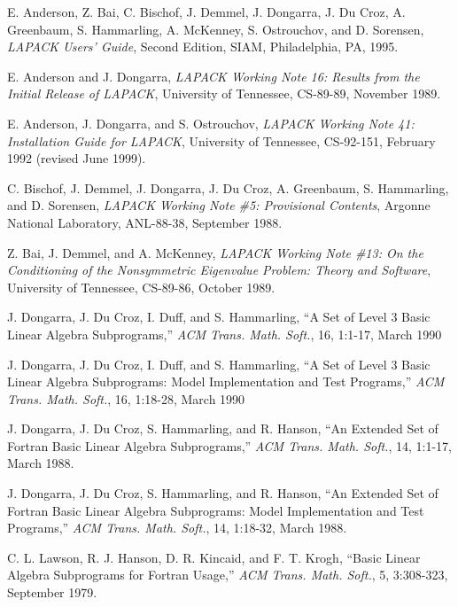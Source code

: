 \documentclass[11pt]{report}
\begin{document}
\begin{thebibliography}{9}

E. Anderson, Z. Bai, C. Bischof, J. Demmel, J. Dongarra,
J. Du Croz, A. Greenbaum, S. Hammarling, A. McKenney,
S. Ostrouchov, and D. Sorensen, 
\textit{LAPACK Users' Guide}, Second Edition,
{SIAM}, Philadelphia, PA, 1995.

E. Anderson and J. Dongarra,
\textit{LAPACK Working Note 16: 
Results from the Initial Release of LAPACK},
University of Tennessee, CS-89-89, November 1989.

E. Anderson, J. Dongarra, and S. Ostrouchov,
\textit{LAPACK Working Note 41: 
Installation Guide for LAPACK},
University of Tennessee, CS-92-151, February 1992 (revised June 1999).

C. Bischof, J. Demmel, J. Dongarra, J. Du Croz, A. Greenbaum,
S. Hammarling, and D. Sorensen,
\textit{LAPACK Working Note \#5:  Provisional Contents},
Argonne National Laboratory, ANL-88-38, September 1988.

Z. Bai, J. Demmel, and A. McKenney,
\textit{LAPACK Working Note \#13: On the Conditioning of the Nonsymmetric
Eigenvalue Problem:  Theory and Software}, 
University of Tennessee, CS-89-86, October 1989.
 
J. Dongarra, J. Du Croz, I. Duff, and S. Hammarling,
``A Set of Level 3 Basic Linear Algebra Subprograms,''
\textit{ACM Trans. Math. Soft.}, 16, 1:1-17, March 1990

J. Dongarra, J. Du Croz, I. Duff, and S. Hammarling,
``A Set of Level 3 Basic Linear Algebra Subprograms:
Model Implementation and Test Programs,''
\textit{ACM Trans. Math. Soft.}, 16, 1:18-28, March 1990

J. Dongarra, J. Du Croz, S. Hammarling, and R. Hanson,
``An Extended Set of Fortran Basic Linear Algebra Subprograms,''
\textit{ACM Trans. Math. Soft.}, 14, 1:1-17, March 1988.

J. Dongarra, J. Du Croz, S. Hammarling, and R. Hanson,
``An Extended Set of Fortran Basic Linear Algebra Subprograms:
Model Implementation and Test Programs,''
\textit{ACM Trans. Math. Soft.}, 14, 1:18-32, March 1988.

C. L. Lawson, R. J. Hanson, D. R. Kincaid, and F. T. Krogh,
``Basic Linear Algebra Subprograms for Fortran Usage,''
\textit{ACM Trans. Math. Soft.}, 5, 3:308-323, September 1979.

\end{thebibliography}
\end{document}
